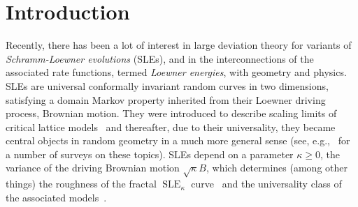 \documentclass[a4paper, 11pt]{article}
\theoremstyle{definition}
\numberwithin{equation}{section}
\numberwithin{figure}{section}
\newcommand{\SLE}[1][]{\operatorname{SLE}_{#1}}
\begin{document}
\section{Introduction}
Recently, there has been a lot of interest in large deviation theory for variants of \emph{Schramm-Loewner evolutions} (SLEs), 
and in the interconnections of the associated rate functions, termed \emph{Loewner energies}, with geometry and physics.
SLEs are universal conformally invariant random curves in two dimensions, satisfying a domain Markov property  
inherited from their Loewner driving process, Brownian motion.
They were introduced to describe scaling limits of critical lattice models~\cite{Schramm:Scaling_limits_of_LERW_and_UST, Schramm:ICM}  
and thereafter, due to their universality, 
they became central objects in random geometry in a much more general sense 
(see, e.g.,~\cite{Lawler:Conformal_invariance_universality_and_the_dimension_of_the_Brownian_frontier, 
Werner:Random_planar_curves_and_SLE, 
Werner:Conformal_restriction_and_related_questions,
Smirnov:Towards_conformal_invariance_of_2D_lattice_models,
Lawler:ICM_Conformally_invariant_loop_measures,Peltola:Towards_CFT_for_SLEs,
Wang:SLE_LDP_survey, Sheffield:ICM_What_is_a_random_surface} for a number of surveys on these topics). 
SLEs depend on a parameter $\kappa \geq 0$, the variance of the driving Brownian motion $\sqrt{\kappa} B$, 
which determines (among other things) the roughness of the fractal $\SLE[\kappa]$ curve~\cite{Rohde-Schramm:Basic_properties_of_SLE, Beffara:Dimension_of_SLE} and the universality class of the associated  models~\cite{Cardy:SLE_for_theoretical_physicists, Bauer-Bernard:2d_growth_processes_SLE_and_Loewner_chains}. 
\end{document}

